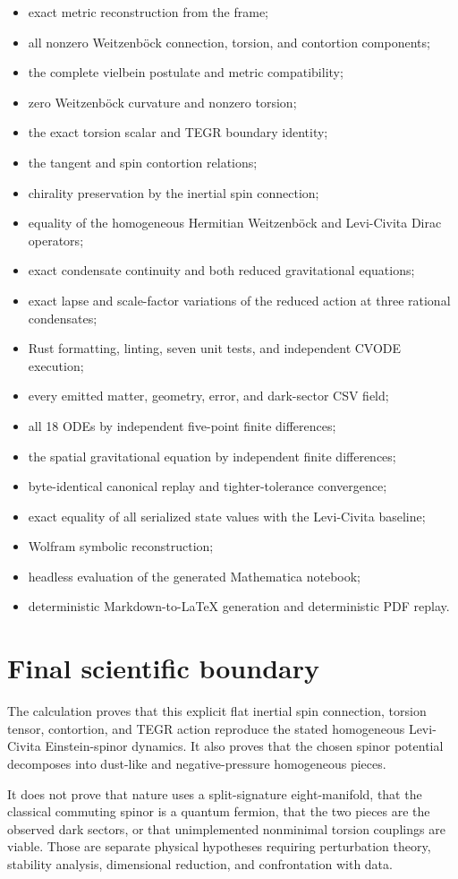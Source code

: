 \documentclass[11pt]{article}
\begin{document}
\begin{itemize}
\item exact metric reconstruction from the frame;
\item all nonzero Weitzenböck connection, torsion, and contortion components;
\item the complete vielbein postulate and metric compatibility;
\item zero Weitzenböck curvature and nonzero torsion;
\item the exact torsion scalar and TEGR boundary identity;
\item the tangent and spin contortion relations;
\item chirality preservation by the inertial spin connection;
\item equality of the homogeneous Hermitian Weitzenböck and Levi-Civita Dirac
operators;

\item exact condensate continuity and both reduced gravitational equations;
\item exact lapse and scale-factor variations of the reduced action at three
rational condensates;

\item Rust formatting, linting, seven unit tests, and independent CVODE execution;
\item every emitted matter, geometry, error, and dark-sector CSV field;
\item all 18 ODEs by independent five-point finite differences;
\item the spatial gravitational equation by independent finite differences;
\item byte-identical canonical replay and tighter-tolerance convergence;
\item exact equality of all serialized state values with the Levi-Civita baseline;
\item Wolfram symbolic reconstruction;
\item headless evaluation of the generated Mathematica notebook;
\item deterministic Markdown-to-LaTeX generation and deterministic PDF replay.
\end{itemize}

\section{Final scientific boundary}

The calculation proves that this explicit flat inertial spin connection, torsion tensor, contortion, and TEGR action reproduce the stated homogeneous Levi-Civita Einstein-spinor dynamics. It also proves that the chosen spinor potential decomposes into dust-like and negative-pressure homogeneous pieces.

It does not prove that nature uses a split-signature eight-manifold, that the classical commuting spinor is a quantum fermion, that the two pieces are the observed dark sectors, or that unimplemented nonminimal torsion couplings are viable. Those are separate physical hypotheses requiring perturbation theory, stability analysis, dimensional reduction, and confrontation with data.
\end{document}
